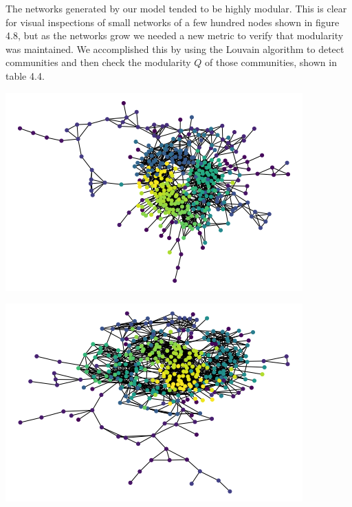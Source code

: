 \documentclass[12pt,twoside]{report}
\begin{document}
The networks generated by our model tended to be highly modular. This is clear for visual inspections of small networks of a few hundred nodes shown in figure 4.8, but as the networks grow we needed a new metric to verify that modularity was maintained. We accomplished this by using the Louvain algorithm \cite{blondel2008fast} to detect communities and then check the modularity $Q$ of those communities, shown in table 4.4. \\


\begin{center}
\begin{minipage}{0.45\linewidth}
\includegraphics[width=\linewidth]{figures/1.png}
\end{minipage}%
\hfill
\begin{minipage}{0.45\linewidth}
\includegraphics[width=\linewidth]{figures/3.png}
\end{minipage}
\end{center}
\end{document}
